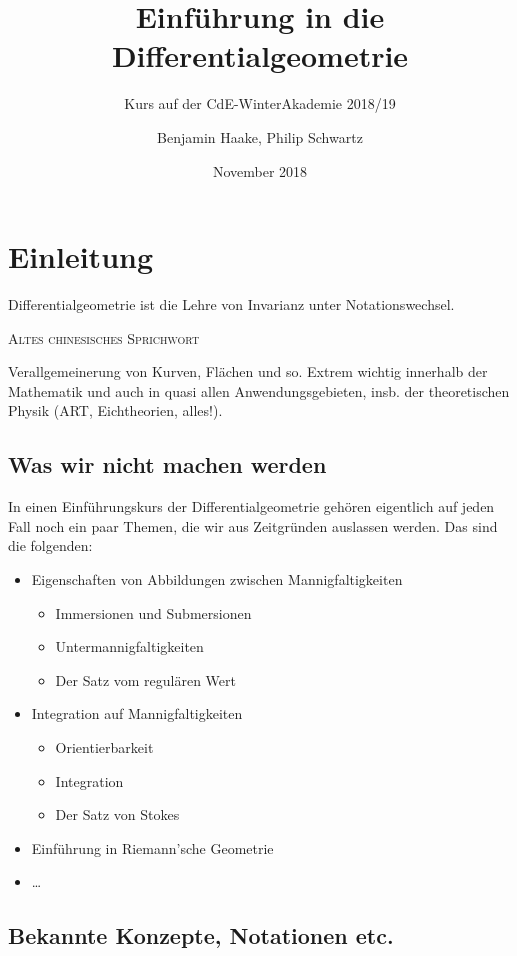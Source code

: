 \documentclass[a4paper]{scrreprt}
\title{Einführung in die Differentialgeometrie}
\subtitle{Kurs auf der CdE-WinterAkademie 2018/19}
\author{Benjamin Haake, Philip Schwartz}
\date{November 2018}
\numberwithin{equation}{chapter}
\theoremstyle{definition}
\begin{document}
\maketitle

\setcounter{chapter}{-1}
\chapter{Einleitung}
\epigraph{Differentialgeometrie ist die Lehre von Invarianz unter Notationswechsel.}{\textsc{Altes chinesisches Sprichwort}}

Verallgemeinerung von Kurven, Flächen und so. Extrem wichtig innerhalb der Mathematik und auch in quasi allen Anwendungsgebieten, insb. der theoretischen Physik (ART, Eichtheorien, alles!).

\section{Was wir nicht machen werden}
In einen Einführungskurs der Differentialgeometrie gehören eigentlich auf jeden Fall noch ein paar Themen, die wir aus Zeitgründen auslassen werden. Das sind die folgenden:
\begin{itemize}
	\item Eigenschaften von Abbildungen zwischen Mannigfaltigkeiten
		\begin{itemize}
			\item Immersionen und Submersionen
			\item Untermannigfaltigkeiten
			\item Der Satz vom regulären Wert
		\end{itemize}
	\item Integration auf Mannigfaltigkeiten
		\begin{itemize}
			\item Orientierbarkeit
			\item Integration
			\item Der Satz von Stokes
		\end{itemize}
	\item Einführung in Riemann'sche Geometrie
	\item \dots
\end{itemize}

\section{Bekannte Konzepte, Notationen etc.}
\end{document}
